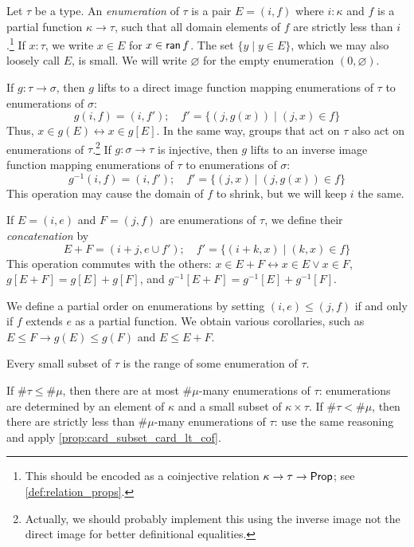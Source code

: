 \begin{definition}[enumeration]
  \label{def:Enumeration}
  Let \( \tau \) be a type.
  An \emph{enumeration} of \( \tau \) is a pair \( E = (i, f) \) where \( i : \kappa \) and \( f \) is a partial function \( \kappa \to \tau \), such that all domain elements of \( f \) are strictly less than \( i \).\footnote{This should be encoded as a coinjective relation \( \kappa \to \tau \to \mathsf{Prop} \); see \cref{def:relation_props}.}
  If \( x : \tau \), we write \( x \in E \) for \( x \in \operatorname{\mathsf{ran}} f \).
  The set \( \{ y \mid y \in E \} \), which we may also loosely call \( E \), is small.
  We will write \( \varnothing \) for the empty enumeration \( (0, \varnothing) \).

  If \( g : \tau \to \sigma \), then \( g \) lifts to a direct image function mapping enumerations of \( \tau \) to enumerations of \( \sigma \):
  \[ g(i, f) = (i, f');\quad f' = \{ (j, g(x)) \mid (j, x) \in f \} \]
  Thus, \( x \in g(E) \leftrightarrow x \in g[E] \).
  In the same way, groups that act on \( \tau \) also act on enumerations of \( \tau \).\footnote{Actually, we should probably implement this using the inverse image not the direct image for better definitional equalities.}
  If \( g : \sigma \to \tau \) is injective, then \( g \) lifts to an inverse image function mapping enumerations of \( \tau \) to enumerations of \( \sigma \):
  \[ g^{-1}(i, f) = (i, f');\quad f' = \{ (j, x) \mid (j, g(x)) \in f \} \]
  This operation may cause the domain of \( f \) to shrink, but we will keep \( i \) the same.

  If \( E = (i, e) \) and \( F = (j, f) \) are enumerations of \( \tau \), we define their \emph{concatenation} by
  \[ E + F = (i + j, e \cup f');\quad f' = \{(i + k, x) \mid (k, x) \in f \} \]
  This operation commutes with the others: \( x \in E + F \leftrightarrow x \in E \vee x \in F \), \( g[E + F] = g[E] + g[F] \), and \( g^{-1}[E + F] = g^{-1}[E] + g^{-1}[F] \).

  We define a partial order on enumerations by setting \( (i, e) \leq (j, f) \) if and only if \( f \) extends \( e \) as a partial function.
  We obtain various corollaries, such as \( E \leq F \to g(E) \leq g(F) \) and \( E \leq E + F \).

  Every small subset of \( \tau \) is the range of some enumeration of \( \tau \).

  If \( \#\tau \leq \#\mu \), then there are at most \( \#\mu \)-many enumerations of \( \tau \): enumerations are determined by an element of \( \kappa \) and a small subset of \( \kappa \times \tau \).
  If \( \#\tau < \#\mu \), then there are strictly less than \( \#\mu \)-many enumerations of \( \tau \): use the same reasoning and apply \cref{prop:card_subset_card_lt_cof}.
\end{definition}
